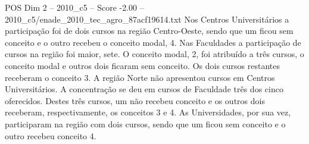\begin{textsample}{POS Dim 2 – 2010\_c5 – Score -2.00 – 2010\_c5/enade\_2010\_tec\_agro\_87acf19614.txt}
Nos Centros Universitários a participação foi de dois cursos na região Centro-Oeste, sendo que um ficou sem conceito e o outro recebeu o conceito modal, 4.
Nas Faculdades a participação de cursos na região foi maior, sete.
O conceito modal, 2, foi atribuído a três cursos, o conceito modal e outros dois ficaram sem conceito.
Os dois cursos restantes receberam o conceito 3.
A região Norte não apresentou cursos em Centros Universitários.
A concentração se deu em cursos de Faculdade três dos cinco oferecidos.
Destes três cursos, um não recebeu conceito e os outros dois receberam, respectivamente, os conceitos 3 e 4.
As Universidades, por sua vez, participaram na região com dois cursos, sendo que um ficou sem conceito e o outro recebeu conceito 4.

\end{textsample}
